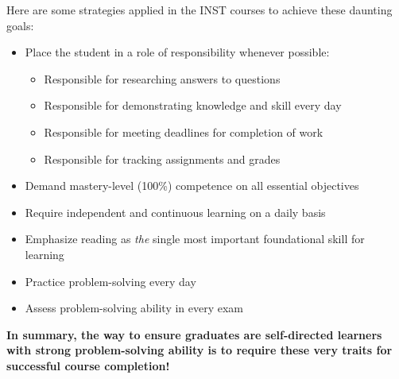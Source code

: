 \vskip 20pt


\noindent
Here are some strategies applied in the INST courses to achieve these daunting goals:

\begin{itemize}
\item{} Place the student in a role of responsibility whenever possible:
\begin{itemize}

\item{} Responsible for researching answers to questions
\item{} Responsible for demonstrating knowledge and skill every day
\item{} Responsible for meeting deadlines for completion of work
\item{} Responsible for tracking assignments and grades
\end{itemize}
\item{} Demand mastery-level (100\%) competence on all essential objectives
\item{} Require independent and continuous learning on a daily basis
\item{} Emphasize reading as {\it the} single most important foundational skill for learning
\item{} Practice problem-solving every day 
\item{} Assess problem-solving ability in every exam
\end{itemize}

\noindent
{\bf In summary, the way to ensure graduates are self-directed learners with strong problem-solving ability is to require these very traits for successful course completion!}







